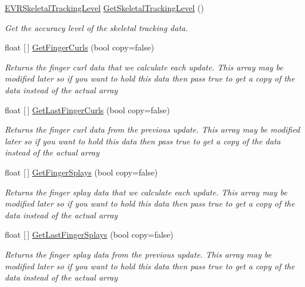 \begin{DoxyCompactItemize}
\mbox{\hyperlink{namespace_valve_1_1_v_r_a6f46bd50fb65255d6537ab32a6bddc30}{E\+V\+R\+Skeletal\+Tracking\+Level}} \mbox{\hyperlink{class_valve_1_1_v_r_1_1_steam_v_r___action___skeleton_af86c841922955baa70deacd0dadb195f}{Get\+Skeletal\+Tracking\+Level}} ()
\begin{DoxyCompactList}\small\item\em Get the accuracy level of the skeletal tracking data. \end{DoxyCompactList}\item 
float \mbox{[}$\,$\mbox{]} \mbox{\hyperlink{class_valve_1_1_v_r_1_1_steam_v_r___action___skeleton_a268243d4d19a66128eae23d0517a0c24}{Get\+Finger\+Curls}} (bool copy=false)
\begin{DoxyCompactList}\small\item\em Returns the finger curl data that we calculate each update. This array may be modified later so if you want to hold this data then pass true to get a copy of the data instead of the actual array \end{DoxyCompactList}\item 
float \mbox{[}$\,$\mbox{]} \mbox{\hyperlink{class_valve_1_1_v_r_1_1_steam_v_r___action___skeleton_a9fc637171c152e4dca320020d17548b8}{Get\+Last\+Finger\+Curls}} (bool copy=false)
\begin{DoxyCompactList}\small\item\em Returns the finger curl data from the previous update. This array may be modified later so if you want to hold this data then pass true to get a copy of the data instead of the actual array \end{DoxyCompactList}\item 
float \mbox{[}$\,$\mbox{]} \mbox{\hyperlink{class_valve_1_1_v_r_1_1_steam_v_r___action___skeleton_af2b48ca77472521036964cb48fcb773c}{Get\+Finger\+Splays}} (bool copy=false)
\begin{DoxyCompactList}\small\item\em Returns the finger splay data that we calculate each update. This array may be modified later so if you want to hold this data then pass true to get a copy of the data instead of the actual array \end{DoxyCompactList}\item 
float \mbox{[}$\,$\mbox{]} \mbox{\hyperlink{class_valve_1_1_v_r_1_1_steam_v_r___action___skeleton_ae9e50b9a7c3151ba215a543692e737dc}{Get\+Last\+Finger\+Splays}} (bool copy=false)
\begin{DoxyCompactList}\small\item\em Returns the finger splay data from the previous update. This array may be modified later so if you want to hold this data then pass true to get a copy of the data instead of the actual array \end{DoxyCompactList}\item 

\end{DoxyCompactItemize}

